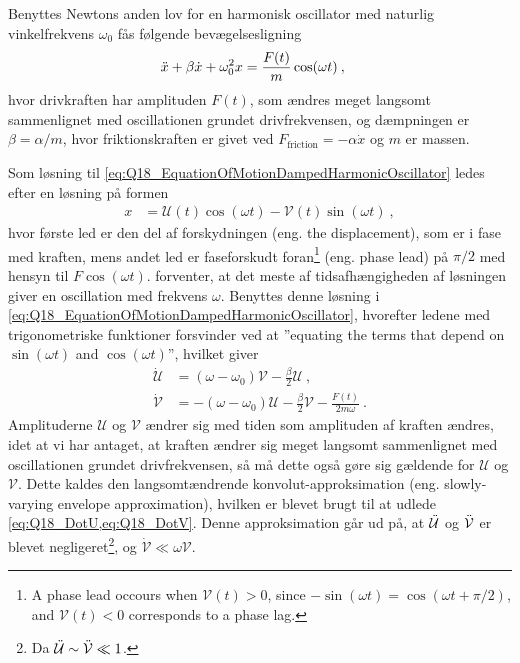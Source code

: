 Benyttes Newtons anden lov for en harmonisk oscillator med naturlig vinkelfrekvens $\omega_0$ fås følgende bevægelsesligning
\begin{align} \label{eq:Q18_EquationOfMotionDampedHarmonicOscillator}
    \Ddot{x} + \beta \Dot{x} + \omega_0^2 x &= \frac{F(t)}{m}\cos(\omega t) \: ,
\end{align}
hvor drivkraften har amplituden $F(t)$, som ændres meget langsomt sammenlignet med oscillationen grundet drivfrekvensen, og dæmpningen er $\beta = \alpha/m$, hvor friktionskraften er givet ved $F_\text{friction} = -\alpha\Dot{x}$ og $m$ er massen.

Som løsning til \cref{eq:Q18_EquationOfMotionDampedHarmonicOscillator} ledes efter en løsning på formen
\begin{align} \label{eq:Q18_FormOfTheSolution}
    x &= \mathcal{U}(t)\cos(\omega t) - \mathcal{V}(t)\sin(\omega t) \: ,
\end{align}
hvor første led er den del af forskydningen (eng. the displacement), som er i fase med kraften, mens andet led er faseforskudt foran\footnote{A phase lead occours when $\mathcal{V}(t) > 0$, since $-\sin(\omega t) = \cos(\omega t + \pi/2)$, and $\mathcal{V}(t) < 0$ corresponds to a phase lag.} (eng. phase lead) på $\pi/2$ med hensyn til $F\cos(\omega t)$.  forventer, at det meste af tidsafhængigheden af løsningen giver en oscillation med frekvens $\omega$. Benyttes denne løsning i \cref{eq:Q18_EquationOfMotionDampedHarmonicOscillator}, hvorefter ledene med trigonometriske funktioner forsvinder ved at ''equating the terms that depend on $\sin(\omega t)$ and $\cos(\omega t)$'', hvilket giver
\begin{align}
    \Dot{\mathcal{U}} &= (\omega - \omega_0)\mathcal{V} - \frac{\beta}{2}\mathcal{U} \: , \label{eq:Q18_DotU} \\
    \Dot{\mathcal{V}} &= -(\omega - \omega_0)\mathcal{U} - \frac{\beta}{2}\mathcal{V} - \frac{F(t)}{2m\omega} \: . \label{eq:Q18_DotV}
\end{align}
Amplituderne $\mathcal{U}$ og $\mathcal{V}$ ændrer sig med tiden som amplituden af kraften ændres, idet at vi har antaget, at kraften ændrer sig meget langsomt sammenlignet med oscillationen grundet drivfrekvensen, så må dette også gøre sig gældende for $\mathcal{U}$ og $\mathcal{V}$. Dette kaldes den \textsf{langsomtændrende konvolut-approksimation} (eng. slowly-varying envelope approximation), hvilken er blevet brugt til at udlede \cref{eq:Q18_DotU,eq:Q18_DotV}. Denne approksimation går ud på, at $\Ddot{\mathcal{U}}$ og $\Ddot{\mathcal{V}}$ er blevet negligeret\footnote{Da $\Ddot{\mathcal{U}} \sim \Ddot{\mathcal{V}} \ll 1$.}, og $\Dot{\mathcal{V}} \ll \omega \mathcal{V}$.

